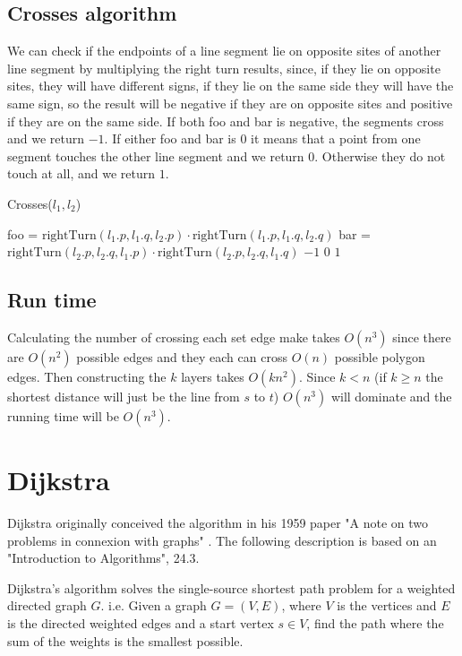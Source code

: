 \subsection{Crosses algorithm}
We can check if the endpoints of a line segment lie on opposite sites of another
line segment by multiplying the right turn results, since, if they lie on opposite sites,
they will have different signs, if they lie on the same side they will have the same
sign, so the result will be negative if they are on opposite sites and positive
if they are on the same side. If both foo and bar is negative, the segments
cross and we return $-1$. If either foo and bar is $0$ it means that a point from
one segment touches the other line segment and we return $0$. Otherwise they do not
touch at all, and we return $1$.
\begin{algorithm}[H]
	\caption{Crosses($l_1,l_2$)}
	\begin{algorithmic}[1] 
		\State foo = $\text{rightTurn}(l_1.p,l_1.q,l_2.p)\cdot
		\text{rightTurn}(l_1.p,l_1.q,l_2.q)$
		\State bar = $\text{rightTurn}(l_2.p,l_2.q,l_1.p)\cdot
		\text{rightTurn}(l_2.p,l_2.q,l_1.q)$
		\State \Return $-1$
		\State \Return $0$
		\Else
		\State \Return $1$
		\EndIf
	\end{algorithmic}
\end{algorithm}

\subsection{Run time}
Calculating the number of crossing each set edge make takes $O(n^3)$ since
there are $O(n^2)$ possible edges and they each can cross $O(n)$ possible
polygon edges. Then constructing the $k$ layers takes $O(k n^2)$. Since $k<n$
(if $k\geq n$ the shortest distance will just be the line from $s$ to $t$)
$O(n^3)$ will dominate and the running time will be $O(n^3)$.

\section{Dijkstra}

Dijkstra originally conceived the algorithm in his 1959 paper "A note on two
problems in connexion with graphs" \cite{dijkstra59}.  The following
description is based on an "Introduction to Algorithms"\cite{IntroToAlg}, 24.3.

Dijkstra's algorithm solves the single-source shortest path problem for a
weighted directed graph $G$. i.e. Given a graph $G=(V,E)$, where $V$ is the
vertices and $E$ is the directed weighted edges and a start vertex $s\in V$,
find the path where the sum of the weights is the smallest possible.

